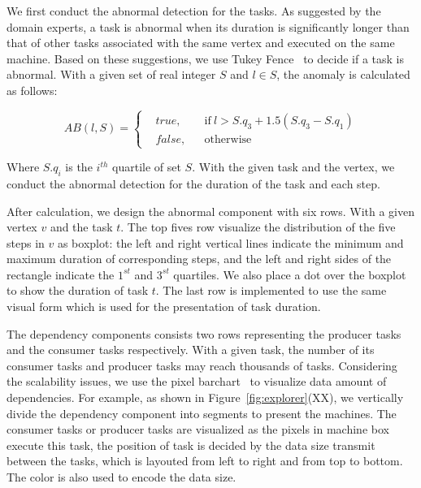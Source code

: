 We first conduct the abnormal detection for the tasks. As suggested by the domain experts, a task is abnormal when its duration is significantly longer than that of other tasks associated with the same vertex and executed on the same machine. Based on these suggestions, we use Tukey Fence~\cite{tukey1977exploratory} to decide if a task is abnormal. With a given set of real integer $S$ and $l \in S$, the anomaly is calculated as follows:

\begin{equation} 
AB(l, S) = \left \{
  \begin{aligned}
    &true, && \text{if}\ l > S.q_3+1.5(S.q_3-S.q_1)\\
    &false, && \text{otherwise}
  \end{aligned} \right.
\end{equation}

Where $S.q_i$ is the $i^{th}$ quartile of set $S$. With the given task and the vertex, we conduct the abnormal detection for the duration of the task and each step. 

After calculation, we design the abnormal component with six rows. With a given vertex $v$ and the task $t$. The top fives row visualize the distribution of the five steps in $v$ as boxplot: the left and right vertical lines indicate the minimum and maximum duration of corresponding steps, and the left and right sides of the rectangle indicate the $1^{st}$ and $3^{st}$ quartiles. We also place a dot over the boxplot to show the duration of task $t$. The last row is implemented to use the same visual form which is used for the presentation of task duration.

The dependency components consists two rows representing the producer tasks and the consumer tasks respectively. With a given task, the number of its consumer tasks and producer tasks may reach thousands of tasks. Considering the scalability issues, we use the pixel barchart~\cite{keim2002pixel} to visualize data amount of dependencies. For example, as shown in Figure~\ref{fig:explorer}{(XX)}, we vertically divide the dependency component into segments to present the machines. 
The consumer tasks or producer tasks are visualized as the pixels in machine box execute this task, the position of task is decided by the data size transmit between the tasks, which is layouted from left to right and from top to bottom. The color is also used to encode the data size. 




